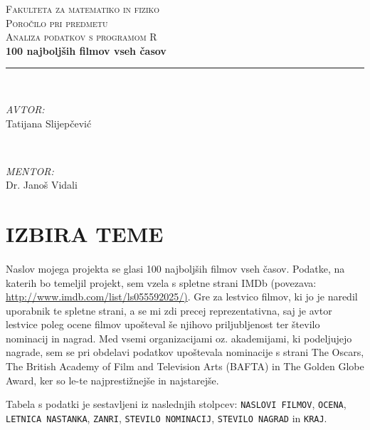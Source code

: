 \documentclass[11pt,a4paper]{article}
\begin{document}
\begin{titlepage}
\newcommand{\HRule}{\rule{\linewidth}{0.7mm}}
\center

\textsc{\LARGE Fakulteta za matematiko in fiziko}\\[3.5cm]
\textsc{\Large Poročilo pri predmetu} \\[0.5cm]
\textsc{Analiza podatkov s programom R}\\[2cm]

{\huge\bfseries 100 najboljših filmov vseh časov}\\[0.1cm]
\HRule \\[5cm]

\begin{minipage}{0.3\textwidth}
\begin{flushleft}\large
\emph{AVTOR:}\\
Tatijana Slijepčević
\end{flushleft}
\end{minipage}
~~~~~~
\begin{minipage}{0.3\textwidth}
\begin{flushleft}\large
\emph{MENTOR:}\\
Dr. Janoš Vidali
\end{flushleft}
\end{minipage}

\end{titlepage}


\section{IZBIRA TEME}
\paragraph{} Naslov mojega projekta se glasi 100 najboljših filmov vseh časov. Podatke, na katerih bo temeljil projekt, sem vzela s spletne strani IMDb (povezava: 
\url{ http://www.imdb.com/list/ls055592025/)}. Gre za lestvico filmov, ki jo je naredil uporabnik te spletne strani, a se mi zdi precej reprezentativna, saj je avtor lestvice poleg ocene filmov upošteval še njihovo priljubljenost ter število nominacij in nagrad. Med vsemi organizacijami oz. akademijami, ki podeljujejo nagrade, sem se pri obdelavi podatkov upoštevala nominacije s strani The Oscars, The British Academy of Film and Television Arts (BAFTA) in The Golden Globe Award, ker so le-te najprestižnejše in najstarejše.

\null
Tabela s podatki je sestavljeni iz naslednjih stolpcev: \verb|NASLOVI FILMOV|, \verb|OCENA|, \verb|LETNICA NASTANKA|, \verb|ZANRI|, \verb|STEVILO NOMINACIJ|, \verb|STEVILO NAGRAD| in \verb|KRAJ|.
\end{document}
